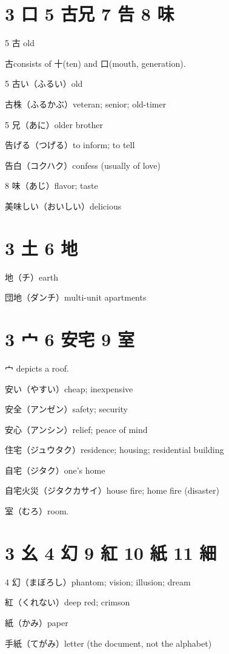 \section{3 口 5 古兄 7 告 8 味}

5 古 old

古consists of 十(ten) and 口(mouth, generation).

5 古い（ふるい）old

古株（ふるかぶ）veteran; senior; old-timer

5 兄（あに）older brother

告げる（つげる）to inform; to tell

告白（コクハク）confess (usually of love)

8 味（あじ）flavor; taste

美味しい（おいしい）delicious

\section{3 土 6 地}

地（チ）earth

団地（ダンチ）multi-unit apartments

\section{3 宀 6 安宅 9 室}

宀 depicts a roof.

安い（やすい）cheap; inexpensive

安全（アンゼン）safety; security

安心（アンシン）relief; peace of mind

住宅（ジュウタク）residence; housing; residential building

自宅（ジタク）one's home

自宅火災（ジタクカサイ）house fire; home fire (disaster)

室（むろ）room.

\section{3 幺 4 幻 9 紅 10 紙 11 細}

4 幻（まぼろし）phantom; vision; illusion; dream

紅（くれない）deep red; crimson

紙（かみ）paper

手紙（てがみ）letter (the document, not the alphabet)

